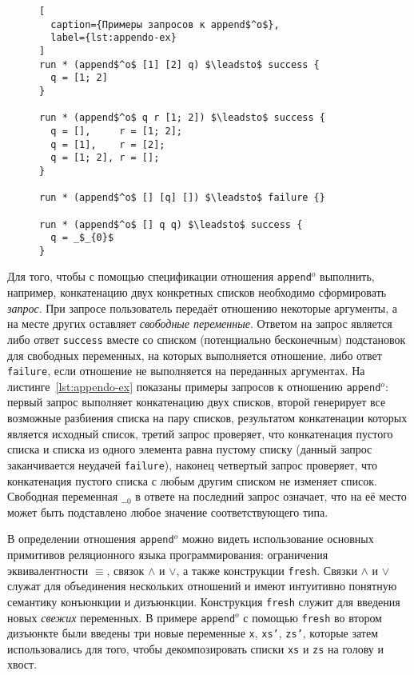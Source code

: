 \begin{figure}[hbt]
\begin{minipage}{\linewidth}
\begin{lstlisting}[
  caption={Примеры запросов к append$^o$},
  label={lst:appendo-ex}
]
run * (append$^o$ [1] [2] q) $\leadsto$ success {
  q = [1; 2]
}

run * (append$^o$ q r [1; 2]) $\leadsto$ success {
  q = [],     r = [1; 2];
  q = [1],    r = [2];
  q = [1; 2], r = [];
}

run * (append$^o$ [] [q] []) $\leadsto$ failure {}

run * (append$^o$ [] q q) $\leadsto$ success {
  q = _$_{0}$
}
\end{lstlisting}
\end{minipage}
\end{figure}

Для того, чтобы с помощью спецификации отношения \texttt{append$^o$}
выполнить, например, конкатенацию двух конкретных списков необходимо сформировать \emph{запрос}.
При запросе пользователь передаёт отношению некоторые аргументы, 
а на месте других оставляет \emph{свободные переменные}.
Ответом на запрос является либо ответ \texttt{success}
вместе со списком (потенциально бесконечным) 
подстановок для свободных переменных, на которых выполняется отношение,
либо ответ \texttt{failure}, если отношение не выполняется на переданных аргументах.
На листинге~\ref{lst:appendo-ex} показаны примеры запросов к отношению \texttt{append$^o$}:
первый запрос выполняет конкатенацию двух списков, 
второй генерирует все возможные разбиения списка на пару списков,
результатом конкатенации которых является исходный список, 
третий запрос проверяет, что конкатенация пустого списка и списка 
из одного элемента равна пустому списку 
(данный запрос заканчивается неудачей \texttt{failure}),
наконец четвертый запрос проверяет, что конкатенация пустого списка 
с любым другим списком не изменяет список.
Свободная переменная \texttt{\_$_{0}$} в ответе на последний запрос означает, 
что на её место может быть подставлено любое значение соответствующего типа.

В определении отношения \texttt{append$^o$} можно видеть использование 
основных примитивов реляционного языка программирования:
ограничения эквивалентности $\equiv$, связок $\wedge$ и $\vee$,
а также конструкции \texttt{fresh}.
Связки $\wedge$ и $\vee$ служат для объединения нескольких 
отношений и имеют интуитивно понятную семантику конъюнкции и дизъюнкции.
Конструкция \texttt{fresh} служит для введения новых \emph{свежих} переменных.
В примере \texttt{append$^o$} с помощью \texttt{fresh} во втором дизъюнкте 
были введены три новые переменные \texttt{x}, \texttt{xs'}, \texttt{zs'}, 
которые затем использовались для того, чтобы декомпозировать 
списки \texttt{xs} и \texttt{zs} на голову и хвост.

